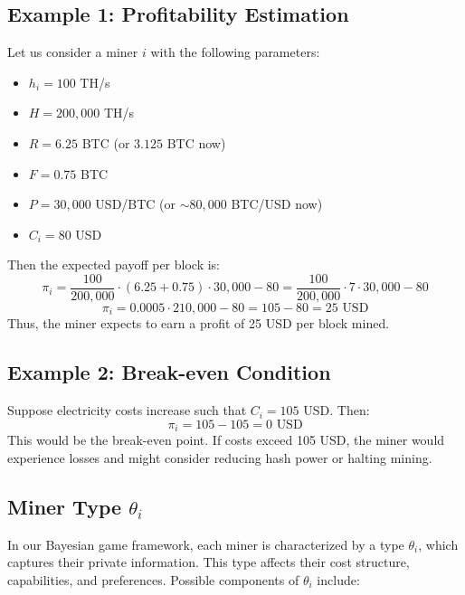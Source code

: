 \documentclass[12pt]{article}
\begin{document}
\subsection*{Example 1: Profitability Estimation}
Let us consider a miner $i$ with the following parameters:
\begin{itemize}
	\item $h_i = 100$ TH/s
	\item $H = 200{,}000$ TH/s
	\item $R = 6.25$ BTC (or $3.125$ BTC now)
	\item $F = 0.75$ BTC
	\item $P = 30{,}000$ USD/BTC (or $\sim 80{,}000$ BTC/USD now)
	\item $C_i = 80$ USD
\end{itemize}
Then the expected payoff per block is:
\begin{equation}
	\pi_i = \frac{100}{200{,}000} \cdot (6.25 + 0.75) \cdot 30{,}000 - 80 = \frac{100}{200{,}000} \cdot 7 \cdot 30{,}000 - 80
\end{equation}
\begin{equation}
	\pi_i = 0.0005 \cdot 210{,}000 - 80 = 105 - 80 = 25 \text{ USD}
\end{equation}
Thus, the miner expects to earn a profit of 25 USD per block mined.

\subsection*{Example 2: Break-even Condition}
Suppose electricity costs increase such that $C_i = 105$ USD. Then:
\begin{equation}
	\pi_i = 105 - 105 = 0 \text{ USD}
\end{equation}
This would be the break-even point. If costs exceed 105 USD, the miner would experience losses and might consider reducing hash power or halting mining.

\subsection*{Miner Type \texorpdfstring{$\theta_i$}{theta}}
In our Bayesian game framework, each miner is characterized by a type $\theta_i$, which captures their private information. This type affects their cost structure, capabilities, and preferences. Possible components of $\theta_i$ include:
\end{document}
